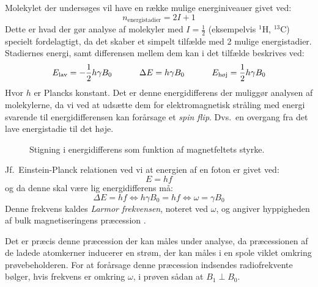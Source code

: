     Molekylet der undersøges vil have en række mulige energiniveauer givet ved:
    \[
        n_{\text{energistadier}}=2I+1
    \]
    Dette er hvad der gør analyse af molekyler med $I=\frac{1}{2}$ (eksempelvis $^1$H, $^{13}$C) specielt fordelagtigt, da det skaber et simpelt tilfælde med 2 mulige energistadier. Stadiernes energi, samt differensen mellem dem kan i det tilfælde beskrives ved:
    \[
        E_{\text{lav}}=-\frac{1}{2}h\gamma B_0 \hskip 32pt \Delta E=h\gamma B_0 \hskip 32pt E_{\text{høj}}=\frac{1}{2}h\gamma B_0
    \]
    Hvor $h$ er Plancks konstant. Det er denne energidifferens der muliggør analysen af molekylerne, da vi ved at udsætte dem for elektromagnetisk stråling med energi svarende til energidifferensen kan forårsage et \textit{spin flip}. Dvs.\ en overgang fra det lave energistadie til det høje. 
    \begin{figure}[H]
        \caption{Stigning i energidifferens som funktion af magnetfeltets styrke.}
    \end{figure}
    Jf.\ Einstein-Planck relationen ved vi at energien af en foton er givet ved:
    \[
        E=hf
    \]
    og da denne skal være lig energidifferens må:
    \[
        \Delta E=hf \Leftrightarrow h\gamma B_0 =hf \Leftrightarrow \omega=\gamma B_0 
    \]
    Denne frekvens kaldes \textit{Larmor frekvensen}, noteret ved $\omega$, og angiver hyppigheden af bulk magnetiseringens præcession \parencite{Derr1,Derr2}.

    Det er præcis denne præcession der kan måles under analyse, da præcessionen af de ladede atomkerner inducerer en strøm, der kan måles i en spole viklet omkring prøvebeholderen. For at forårsage denne præcession indsendes radiofrekvente bølger, hvis frekvens er omkring $\omega$, i prøven sådan at $B_1 \perp B_0$. 

